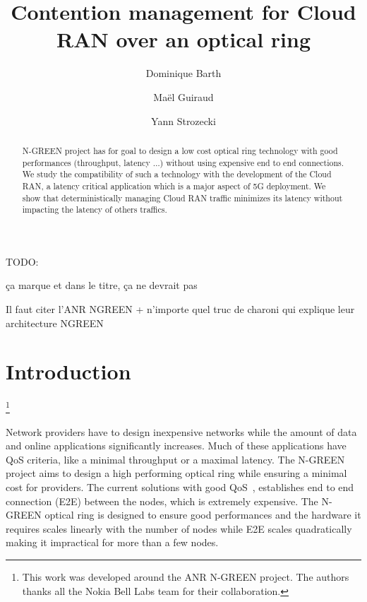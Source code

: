 \documentclass[]{algotel}
\title{Contention management for Cloud RAN over an optical ring}
\author{Dominique Barth\addressmark{1}
  \and Ma\"el Guiraud \addressmark{1,2}
   \and Yann Strozecki \addressmark{1}
  }
\newcommand{\todo}[1]{{\color{red} TODO: {#1}}}
\begin{document}
\maketitle


\begin{abstract}

N-GREEN project has for goal to design a low cost optical ring technology with good performances (throughput, latency $\dots$) without using expensive end to end connections. We study the compatibility of such a technology with the development of the Cloud RAN, a latency critical application which is a major aspect of 5G deployment. We show that deterministically managing Cloud RAN traffic minimizes its latency without impacting the latency of others traffics. 
\end{abstract}

\todo{ça marque et dans le titre, ça ne devrait pas

Il faut citer l'ANR NGREEN + n'importe quel truc de charoni qui explique leur architecture NGREEN}


\section{Introduction}
 \footnote{ This work was developed around the ANR N-GREEN project. The authors thanks all the Nokia Bell Labs team for their collaboration.} 

Network providers have to design inexpensive networks while the amount of data and online applications significantly increases. Much of these applications have QoS criteria, like a minimal throughput or a maximal latency. The N-GREEN project aims to design a high performing optical ring while ensuring a minimal cost for providers. The current solutions with good QoS~\cite{pizzinat2015things}, establishes end to end connection (E2E) between the nodes, which is extremely expensive. The N-GREEN optical ring is designed to ensure good performances and the hardware it requires scales linearly with the number of nodes while E2E scales quadratically making it impractical for more than a few nodes.
\end{document}
